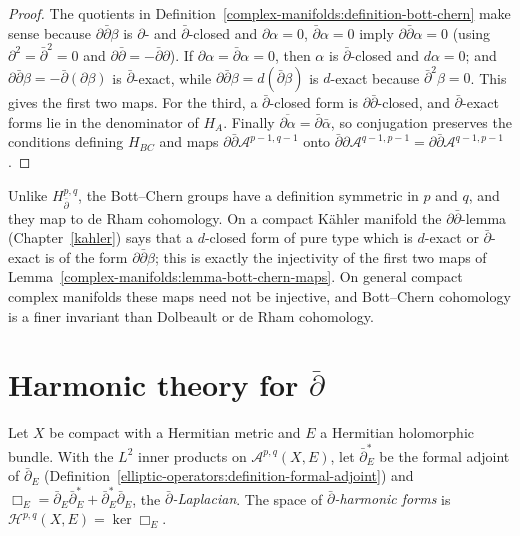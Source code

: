 \begin{proof}
The quotients in Definition~\ref{complex-manifolds:definition-bott-chern} make sense because $\partial\bar\partial\beta$ is $\partial$- and $\bar\partial$-closed and $\partial\alpha = 0$, $\bar\partial\alpha = 0$ imply
$\partial\bar\partial\alpha = 0$ (using $\partial^2 = \bar\partial^2 = 0$ and $\partial\bar\partial = -\bar\partial\partial$). If $\partial\alpha = \bar\partial\alpha = 0$, then $\alpha$ is $\bar\partial$-closed and
$d\alpha = 0$; and $\partial\bar\partial\beta = -\bar\partial(\partial\beta)$ is $\bar\partial$-exact, while $\partial\bar\partial\beta = d(\bar\partial\beta)$ is $d$-exact because $\bar\partial^2\beta = 0$. This gives the first
two maps. For the third, a $\bar\partial$-closed form is $\partial\bar\partial$-closed, and $\bar\partial$-exact forms lie in the denominator of $H_A$. Finally $\overline{\partial\alpha} = \bar\partial\bar\alpha$, so conjugation
preserves the conditions defining $H_{BC}$ and maps $\partial\bar\partial\mathcal{A}^{p-1,q-1}$ onto $\bar\partial\partial\mathcal{A}^{q-1,p-1} = \partial\bar\partial\mathcal{A}^{q-1,p-1}$.
\end{proof}

\begin{remark}\label{complex-manifolds:remark-bott-chern}
Unlike $H^{p,q}_{\bar\partial}$, the Bott--Chern groups have a definition symmetric in $p$ and $q$, and they map to de Rham cohomology. On a compact K\"ahler manifold the $\partial\bar\partial$-lemma
(Chapter~\ref{kahler}) says that a $d$-closed form of pure type which is $d$-exact or $\bar\partial$-exact is of the form $\partial\bar\partial\beta$; this is exactly the injectivity of the first two
maps of Lemma~\ref{complex-manifolds:lemma-bott-chern-maps}. On general compact complex manifolds these maps need not be injective, and Bott--Chern cohomology is a finer invariant than Dolbeault or de Rham
cohomology.
\end{remark}

\section{Harmonic theory for $\bar\partial$}\label{complex-manifolds:section-harmonic}

\begin{definition}\label{complex-manifolds:definition-dbar-laplacian}
Let $X$ be compact with a Hermitian metric and $E$ a Hermitian holomorphic bundle. With the $L^2$ inner products on $\mathcal{A}^{p,q}(X, E)$, let $\bar\partial_E^*$ be the formal adjoint of $\bar\partial_E$
(Definition~\ref{elliptic-operators:definition-formal-adjoint}) and $\Box_E = \bar\partial_E\bar\partial_E^* + \bar\partial_E^*\bar\partial_E$, the \emph{$\bar\partial$-Laplacian}. The space of
\emph{$\bar\partial$-harmonic forms} is $\mathcal{H}^{p,q}(X, E) = \ker\Box_E$.
\end{definition}


